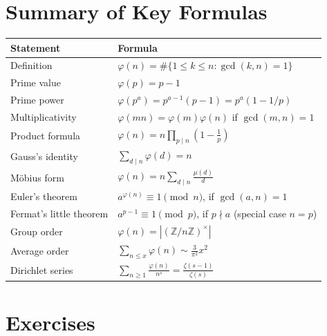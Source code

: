 \documentclass[11pt]{article}
\theoremstyle{definition}
\theoremstyle{remark}
\newcommand{\Z}{\mathbb{Z}}
\begin{document}
\section{Summary of Key Formulas}

\begin{center}
\renewcommand{\arraystretch}{1.6}
\begin{tabular}{p{6.7cm}p{7.5cm}}
\toprule
\textbf{Statement} & \textbf{Formula} \\
\midrule
Definition & $\varphi(n) = \#\{1\le k\le n : \gcd(k,n)=1\}$ \\
Prime value & $\varphi(p) = p-1$ \\
Prime power & $\varphi(p^a) = p^{a-1}(p-1) = p^a(1-1/p)$ \\
Multiplicativity & $\varphi(mn) = \varphi(m)\varphi(n)$ if $\gcd(m,n)=1$ \\
Product formula & $\varphi(n) = n\displaystyle\prod_{p \mid n}\left(1 - \frac1p\right)$ \\
Gauss's identity & $\displaystyle\sum_{d\mid n}\varphi(d) = n$ \\
Möbius form & $\varphi(n) = n\displaystyle\sum_{d\mid n}\frac{\mu(d)}{d}$ \\
Euler's theorem & $a^{\varphi(n)} \equiv 1 \pmod n$, if $\gcd(a,n)=1$ \\
Fermat's little theorem & $a^{p-1}\equiv 1\pmod p$, if $p\nmid a$ (special case $n=p$) \\
Group order & $\varphi(n) = |(\Z/n\Z)^\times|$ \\
Average order & $\displaystyle\sum_{n\le x}\varphi(n) \sim \frac{3}{\pi^2}x^2$ \\
Dirichlet series & $\displaystyle\sum_{n\ge1}\frac{\varphi(n)}{n^s} = \frac{\zeta(s-1)}{\zeta(s)}$ \\
\bottomrule
\end{tabular}
\end{center}

\section{Exercises}
\end{document}
